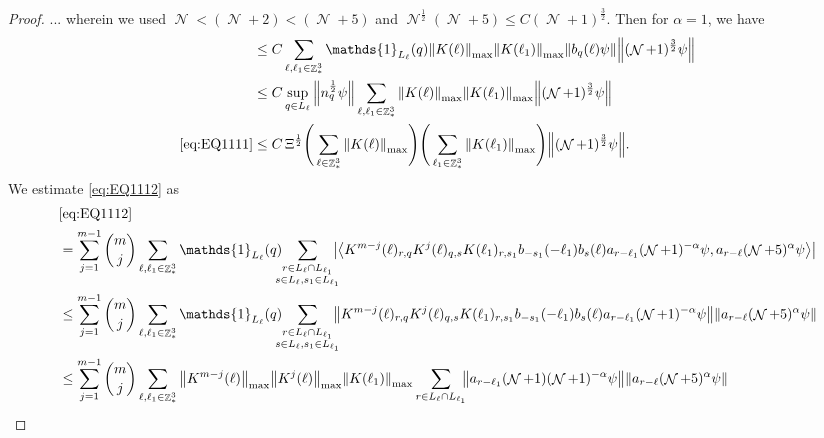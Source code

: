 \documentclass[sn-mathphys, Numbered ,a4paper]{sn-jnl}%
\DeclareMathOperator{\Z}{\mathbb{Z}}
\DeclareMathOperator{\NN}{\mathcal{N}}
\newcommand{\half}{\frac{1}{2}}
\newcommand{\eva}[1]{\left\langle #1 \right\rangle}
\theoremstyle{plain}
\theoremstyle{definition}
\theoremstyle{remark}
\theoremstyle{plain}
\theoremstyle{definition}
\theoremstyle{remark}
\begin{document}
\begin{proof}
...
wherein we used $\NN<(\NN+2)<(\NN+5)$ and $\NN^\half(\NN+5)\leq C(\NN+1)^{\frac{3}{2}}$. Then for $\alpha = 1$, we have
\begin{align}
    &\leq C\sum\limits_{\ell,\ell_1 \in \Z^3_*} \mathds{1}_{L_\ell}(q) \norm{K(\ell)}_{\mathrm{max}}\norm{K(\ell_1)}_{\mathrm{max}}  \norm{b_{q}(\ell) \psi} \norm { (\NN+1)^{\frac{3}{2}} \psi }\nonumber\\
    &\leq C \sup\limits_{q \in L_\ell} \norm{n_{q}^{\half} \psi} \sum\limits_{\ell,\ell_1 \in \Z^3_*} \norm{K(\ell)}_{\mathrm{max}}\norm{K(\ell_1)}_{\mathrm{max}} \norm { (\NN+1)^{\frac{3}{2}} \psi }\nonumber\\
    \eqref{eq:EQ1111}&\leq C\, \Xi^\half \Bigg(\sum\limits_{\ell \in \Z^3_*} \norm{K(\ell)}_{\mathrm{max}}\Bigg)\Bigg( \sum\limits_{\ell_1 \in \Z^3_*}\norm{K(\ell_1)}_{\mathrm{max}} \Bigg)  \norm { (\NN+1)^{\frac{3}{2}} \psi }. \label{eq:estEQ1111}    
\end{align}
We estimate \eqref{eq:EQ1112} as 
\begin{alignat}{2}
	&\eqref{eq:EQ1112}\nonumber\\
	&= \sum\limits_{j=1}^{m-1} {{m}\choose j} \sum\limits_{\ell, \ell_1\in \Z^3_*} \mathds{1}_{L_{\ell}}(q)\!\!\!\! \sum\limits_{\substack{r\in L_{\ell} \cap L_{\ell_1}\\ s \in L_{\ell},s_1\in L_{\ell_1}}}\!\!\!\! \abs{ \eva{ K^{m-j}(\ell)_{r,q} K^{j}(\ell)_{q,s} K(\ell_1)_{r,s_1} b_{-s_1}(-\ell_1) b_{s}(\ell) a_{r-\ell_1}(\NN+1)^{-\alpha} \psi,  a_{r-\ell}(\NN+5)^{\alpha} \psi }}\nonumber\\
	&\leq \sum\limits_{j=1}^{m-1} {{m}\choose j} \sum\limits_{\ell, \ell_1\in \Z^3_*} \mathds{1}_{L_{\ell}}(q)\!\!\!\! \sum\limits_{\substack{r\in L_{\ell} \cap L_{\ell_1}\\ s \in L_{\ell},s_1\in L_{\ell_1}}}\!\!\!\! \norm{ K^{m-j}(\ell)_{r,q} K^{j}(\ell)_{q,s} K(\ell_1)_{r,s_1} b_{-s_1}(-\ell_1) b_{s}(\ell) a_{r-\ell_1}(\NN+1)^{-\alpha} \psi}\norm{  a_{r-\ell}(\NN+5)^{\alpha} \psi }\nonumber\\
	&\leq \sum\limits_{j=1}^{m-1} {{m}\choose j} \sum\limits_{\ell, \ell_1\in \Z^3_*} \norm{K^{m-j}(\ell)}_{\mathrm{max}} \norm{ K^{j}(\ell)}_{\mathrm{max}} \norm{ K(\ell_1) }_{\mathrm{max}} \sum\limits_{r\in L_{\ell} \cap L_{\ell_1}}\!\!\! \norm{ a_{r-\ell_1} (\NN+1) (\NN+1)^{-\alpha} \psi} \norm{a_{r-\ell} (\NN+5)^{\alpha}\psi }\nonumber

\end{alignat}
\end{proof}
\end{document}

